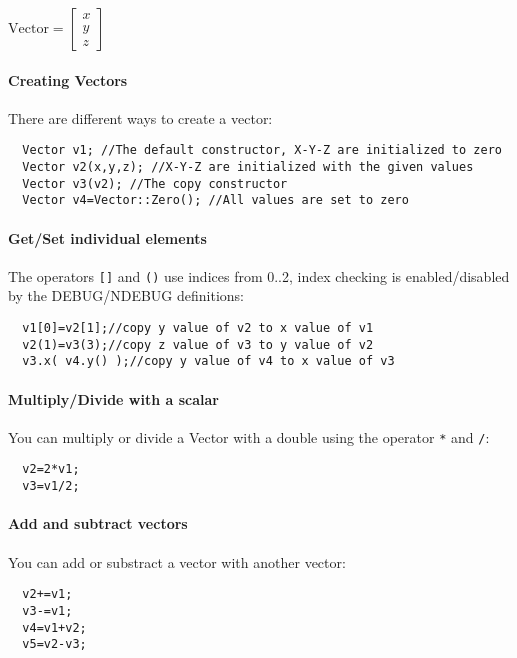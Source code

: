 \documentclass[a4paper,10pt]{report}
\begin{document}
$\mathrm{Vector} = \left[\begin{array}{c} x \\ y \\ z \end{array} \right]$

\paragraph{Creating Vectors}
\label{sec:creating-vectors}
There are different ways to create a vector:
\begin{lstlisting}
  Vector v1; //The default constructor, X-Y-Z are initialized to zero
  Vector v2(x,y,z); //X-Y-Z are initialized with the given values
  Vector v3(v2); //The copy constructor
  Vector v4=Vector::Zero(); //All values are set to zero
\end{lstlisting}

\paragraph{Get/Set individual elements}
\label{sec:gets-indiv-elem}
The operators \lstinline$[]$ and \lstinline$()$ use indices from 0..2,
index checking is enabled/disabled by the DEBUG/NDEBUG definitions:
\begin{lstlisting}
  v1[0]=v2[1];//copy y value of v2 to x value of v1 
  v2(1)=v3(3);//copy z value of v3 to y value of v2
  v3.x( v4.y() );//copy y value of v4 to x value of v3
\end{lstlisting}

\paragraph{Multiply/Divide with a scalar}
\label{sec:mult-with-scal}
You can multiply or divide a Vector with a double using the operator
\lstinline$*$ and \lstinline$/$:
\begin{lstlisting}
  v2=2*v1;
  v3=v1/2;
\end{lstlisting}

\paragraph{Add and subtract vectors}
\label{sec:add-subtract-vectors}
You can add or substract a vector with another vector:
\begin{lstlisting}
  v2+=v1;
  v3-=v1;
  v4=v1+v2;
  v5=v2-v3;
\end{lstlisting}
\end{document}
